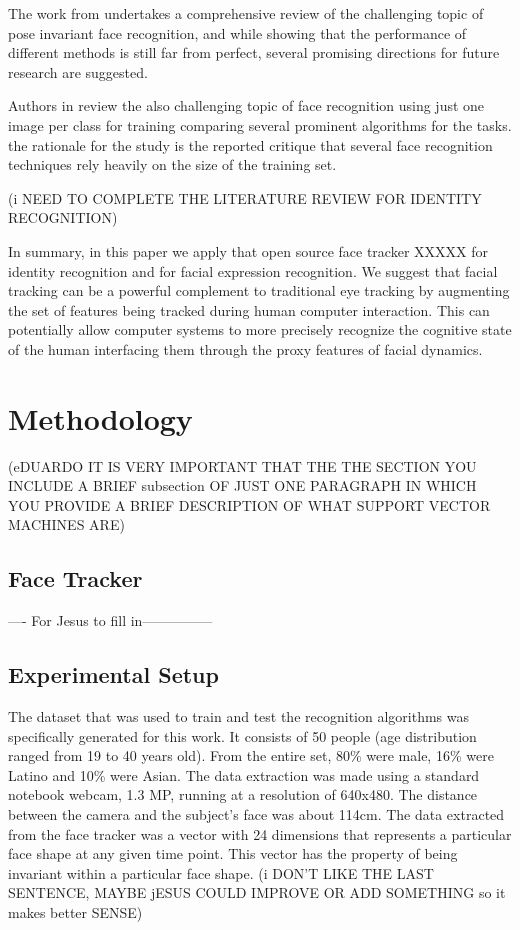 \documentclass[]{article}
\begin{document}
The work from \cite{Zhang20092876} undertakes a comprehensive review  of the challenging topic of pose invariant face
recognition, and while showing that the performance of different methods is still far from perfect, several promising
directions for future research  are suggested.

Authors in \cite{Tan20061725} review the also challenging topic of face recognition using  just one image per
class for training comparing several prominent algorithms for the tasks. the rationale for the study is the reported
critique that several face recognition techniques rely heavily on the size of the training set.

(i NEED TO COMPLETE THE LITERATURE REVIEW FOR IDENTITY RECOGNITION)

In summary, in this paper we apply that open source face tracker XXXXX for identity recognition and for facial
expression recognition. We suggest that facial tracking can be a powerful complement to traditional eye tracking  by
augmenting the set of features being tracked during human computer interaction. This  can potentially allow computer
systems to more precisely recognize the cognitive state of the human interfacing them through the proxy features of facial
dynamics.


\section{Methodology}
(eDUARDO IT IS VERY IMPORTANT THAT THE THE SECTION YOU INCLUDE A BRIEF subsection OF JUST ONE PARAGRAPH IN WHICH YOU
PROVIDE A BRIEF DESCRIPTION OF WHAT SUPPORT VECTOR MACHINES ARE)

\subsection{Face Tracker}
---- For Jesus to fill in---------------

\subsection{Experimental Setup}
The dataset that was used to train and test the recognition algorithms was specifically generated for this work. It
consists of 50 people (age distribution ranged from 19 to 40 years old). From the entire set, 80\% were male, 16\% were
Latino and 10\% were Asian. The data extraction was made using a standard notebook webcam, 1.3 MP, running at a
resolution of 640x480. The distance between the camera and the subject's face was about 114cm. The data extracted from
the face tracker was a vector with 24 dimensions that represents a particular face shape at any given time point. This
vector has the property of being invariant within a particular face shape.
(i DON'T LIKE THE LAST SENTENCE, MAYBE jESUS COULD IMPROVE OR ADD SOMETHING so it makes better SENSE)
\end{document}
